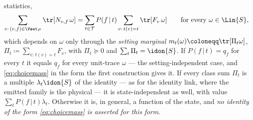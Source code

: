 \begin{lemma}
\begin{enumerate}[label=(\roman*),leftmargin=2.2em]
statistics,
\begin{equation}\label{eq:fmarginal}
  \sum_{v:\,(v,f)\in\Vset_P}\tr[N_{v,f}\,\omega]
  =\sum_{t\in\mathcal{T}}P(f\,|\,t)\sum_{v:\,t(v)=t}\tr[F_v\,\omega]
  \qquad\text{for every }\omega\in\Lin{S},
\end{equation}
which depends on $\omega$ only through the \emph{setting marginal}
$m_t(\omega)\coloneqq\tr[\Pi_t\omega]$, $\Pi_t\coloneqq\sum_{v:\,t(v)=t}F_v$,
with $\Pi_t\succeq0$ and $\sum_t\Pi_t=\idon{S}$. If $P(f\,|\,t)=q_f$ for
every $t$ it equals $q_f$ for every unit-trace $\omega$ --- the
setting-independent case, and \eqref{eq:choicemass} in the form the first
construction gives it. If every class sum $\Pi_t$ is a multiple
$\lambda_t\idon{S}$ of the identity --- as for the identity link, where the
emitted family is the physical  --- it is state-independent as
well, with value $\sum_tP(f\,|\,t)\lambda_t$. Otherwise it is, in general, a
function of the state, and \emph{no identity of the form
\eqref{eq:choicemass} is asserted for this form}.
\end{enumerate}
\end{lemma}

